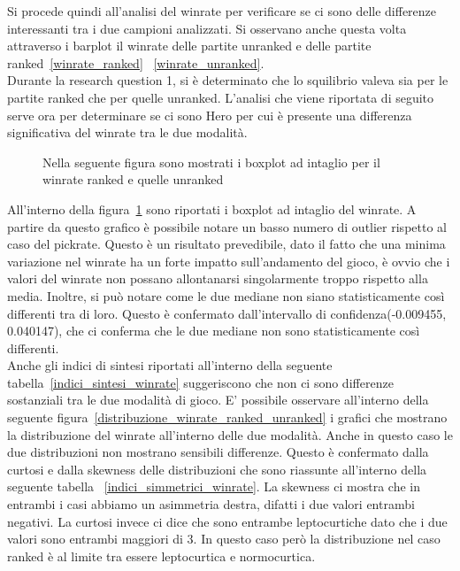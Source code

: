 Si procede quindi all'analisi del winrate per verificare se ci sono delle differenze interessanti tra i due campioni analizzati. Si osservano anche questa volta attraverso i barplot il winrate delle partite unranked e delle partite ranked~\ref{winrate_ranked} ~\ref{winrate_unranked}. \\
Durante la research question 1, si è determinato che lo squilibrio valeva sia per le partite ranked che per quelle unranked. L'analisi che viene riportata di seguito serve ora per determinare se ci sono Hero per cui è presente una differenza significativa del winrate tra le due modalità. \\ 
\begin{figure}[htbp]
\begin{center}

\caption{Nella seguente figura sono mostrati i boxplot ad intaglio per il winrate ranked e quelle unranked}
\label{boxplot_winrate}
\end{center}
\end{figure}
All'interno della figura~\ref{boxplot_winrate} sono riportati i boxplot ad intaglio del winrate. A partire da questo grafico è possibile notare un basso numero di outlier rispetto al caso del pickrate. Questo è un risultato prevedibile, dato il fatto che una minima variazione nel winrate ha un forte impatto sull'andamento del gioco, è ovvio che i valori del winrate non possano allontanarsi singolarmente troppo rispetto alla media.
Inoltre, si può notare come le due mediane non siano statisticamente così differenti tra di loro. Questo è confermato dall'intervallo di confidenza(-0.009455, 0.040147), che ci conferma che le due mediane non sono statisticamente così differenti. \\
Anche gli indici di sintesi riportati all'interno della seguente tabella~\ref{indici_sintesi_winrate} suggeriscono che non ci sono differenze sostanziali tra le due modalità di gioco. E' possibile osservare all'interno della seguente figura~\ref{distribuzione_winrate_ranked_unranked} i grafici che mostrano la distribuzione del winrate all'interno delle due modalità. Anche in questo caso le due distribuzioni non mostrano sensibili differenze. Questo è confermato dalla curtosi e dalla skewness delle distribuzioni che sono riassunte all'interno della seguente tabella ~\ref{indici_simmetrici_winrate}. La skewness ci mostra che in entrambi i casi abbiamo un asimmetria destra, difatti i due valori entrambi negativi. La curtosi invece ci dice che sono entrambe leptocurtiche dato che i due valori sono entrambi maggiori di 3. In questo caso però la distribuzione nel caso ranked è al limite tra essere leptocurtica e normocurtica. \\  
